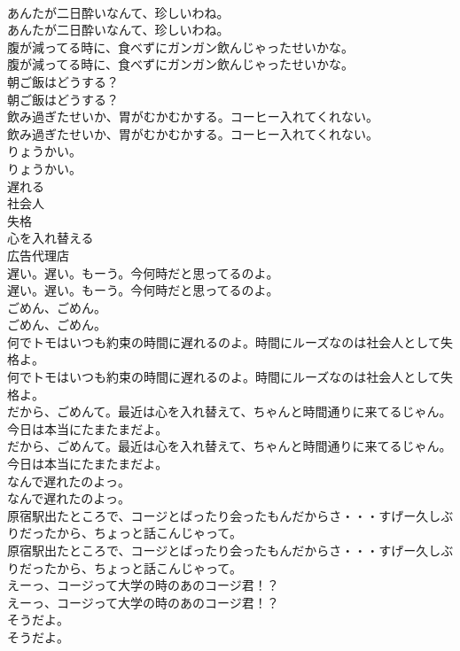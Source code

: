 \documentclass[8pt]{extreport}
\begin{document}
\begin{CJK}{UTF8}{min}
\\	あんたが二日酔いなんて、珍しいわね。	
\\	あんたが二日酔いなんて、珍しいわね。 
\\	腹が減ってる時に、食べずにガンガン飲んじゃったせいかな。	
\\	腹が減ってる時に、食べずにガンガン飲んじゃったせいかな。 
\\	朝ご飯はどうする？	
\\	朝ご飯はどうする？ 
\\	飲み過ぎたせいか、胃がむかむかする。コーヒー入れてくれない。	
\\	飲み過ぎたせいか、胃がむかむかする。コーヒー入れてくれない。 
\\	りょうかい。	
\\	りょうかい。 
\\	遅れる
\\	社会人
\\	失格
\\	心を入れ替える
\\	広告代理店
\\	遅い。遅い。もーう。今何時だと思ってるのよ。	
\\	遅い。遅い。もーう。今何時だと思ってるのよ。 
\\	ごめん、ごめん。	
\\	ごめん、ごめん。 
\\	何でトモはいつも約束の時間に遅れるのよ。時間にルーズなのは社会人として失格よ。	
\\	何でトモはいつも約束の時間に遅れるのよ。時間にルーズなのは社会人として失格よ。 
\\	だから、ごめんて。最近は心を入れ替えて、ちゃんと時間通りに来てるじゃん。今日は本当にたまたまだよ。	
\\	だから、ごめんて。最近は心を入れ替えて、ちゃんと時間通りに来てるじゃん。今日は本当にたまたまだよ。 
\\	なんで遅れたのよっ。	
\\	なんで遅れたのよっ。 
\\	原宿駅出たところで、コージとばったり会ったもんだからさ・・・すげー久しぶりだったから、ちょっと話こんじゃって。	
\\	原宿駅出たところで、コージとばったり会ったもんだからさ・・・すげー久しぶりだったから、ちょっと話こんじゃって。 
\\	えーっ、コージって大学の時のあのコージ君！？	
\\	えーっ、コージって大学の時のあのコージ君！？ 
\\	そうだよ。	
\\	そうだよ。 

\end{CJK}
\end{document}
